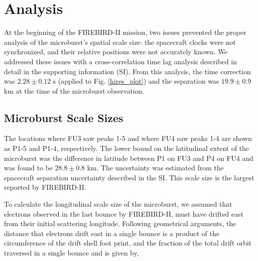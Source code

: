 \documentclass[draft, linenumbers]{agujournal}
\begin{document}
\section{Analysis} \label{analysis} %
At the beginning of the FIREBIRD-II mission, two issues prevented the proper analysis of the microburst's spatial scale size: the spacecraft clocks were not synchronized, and their relative positions were not accurately known. We addressed these issues with a cross-correlation time lag analysis described in detail in the supporting information (SI). From this analysis, the time correction was $2.28 \pm 0.12$ s (applied to Fig. \ref{hires_plot}) and the separation was $19.9 \pm 0.9$ km at the time of the microburst observation.

\subsection{Microburst Scale Sizes} \label{scale_size} %

 The locations where FU3 saw peaks 1-5 and where FU4 saw peaks 1-4 are shown as P1-5 and P1-4, respectively. The lower bound on the latitudinal extent of the microburst was the difference in latitude between P1 on FU3 and P4 on FU4 and was found to be $28.8 \pm 0.8$ km. The uncertainty was estimated from the spacecraft separation uncertainty described in the SI. This scale size is the largest reported by FIREBIRD-II.

To calculate the longitudinal scale size of the microburst, we assumed that  electrons observed in the last bounce by FIREBIRD-II, must have drifted east from their initial scattering longitude. Following geometrical arguments, the distance that electrons drift east in a single bounce is a product of the circumference of the drift shell foot print, and the fraction of the total drift orbit traversed in a single bounce and is given by, 
\end{document}

